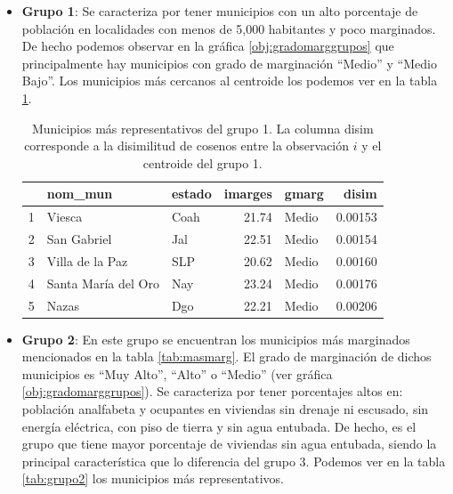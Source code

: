 \begin{itemize}
\item \textbf{Grupo 1}: Se caracteriza por tener municipios con un alto porcentaje de población en localidades con menos de 5,000 habitantes y poco marginados. De hecho podemos observar en la gráfica \ref{obj:gradomarggrupos} que principalmente hay municipios con grado de marginación ``Medio'' y ``Medio Bajo''. Los municipios más cercanos al centroide los podemos ver en la tabla \ref{tab:grupo1}.

\begin{table}[!ht]
\centering
\begin{tabular}{rllrlr}
  \hline
 & nom\_mun & estado & imarges & gmarg & disim \\ 
  \hline
1 & Viesca & Coah & 21.74 & Medio & 0.00153 \\ 
  2 & San Gabriel & Jal & 22.51 & Medio & 0.00154 \\ 
  3 & Villa de la Paz & SLP & 20.62 & Medio & 0.00160 \\ 
  4 & Santa María del Oro & Nay & 23.24 & Medio & 0.00176 \\ 
  5 & Nazas & Dgo & 22.21 & Medio & 0.00206 \\ 
   \hline
\end{tabular}
\caption{Municipios más representativos del grupo 1. La columna disim corresponde a la disimilitud de cosenos entre la observación $i$ y el centroide del grupo 1. \label{tab:grupo1}}
\end{table}

\item \textbf{Grupo 2}: En este grupo se encuentran los municipios más marginados mencionados en la tabla \ref{tab:masmarg}. El grado de marginación de dichos municipios es ``Muy Alto'', ``Alto'' o ``Medio'' (ver gráfica \ref{obj:gradomarggrupos}). 
Se caracteriza por tener porcentajes altos en: población analfabeta y ocupantes en viviendas sin drenaje ni escusado, sin energía eléctrica, con piso de tierra y sin agua entubada. De hecho, es el grupo que tiene mayor porcentaje de viviendas sin agua entubada, siendo la principal característica que lo diferencia del grupo 3. Podemos ver en la tabla \ref{tab:grupo2} los municipios más representativos.


\end{itemize}
